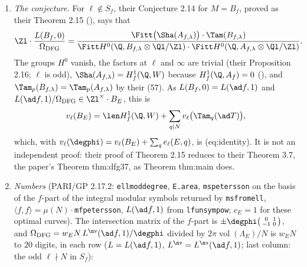 \begin{remark}
\begin{enumerate}[label=(\alph*)]
Deligne's period relative to their integral structure, $\Omega_{\mathrm{DFG}}=c^+(B_f)/e$, satisfies
\[
\Omega_{\mathrm{DFG}}\in\Zl^\times\cdot\frac{w_EN\,L^{\nv}(\ad f,1)}{\degphi}=\Zl^\times\cdot w_E\,\frac{2\pi\operatorname{vol}(\Lambda_E)}{c_E^2}=\Zl^\times\cdot w_EN\cdot\frac{2\pi\operatorname{vol}(\Lambda_E)}{c_E^2N}.
\]
If $e$ is normalised by the $\Z$-lattice $\varphi_E^*H^1(E,\Z)$ with the pairing $\frac12\langle x,w_N^*y\rangle$, the unit is $\pm1$: the $\frac12$ of (d) cancels the $\frac12$ of the pairing, and
$\degphi$ cancels between the Petersson norm and $\eta^\emptyset$. The only discrepancy with the book's normalisation $2\pi\operatorname{vol}(\Lambda_E)/(c_E^2N)$ is therefore the factor $w_EN$,
a unit at every $\ell\nmid N$; no power of $2$ or $\pi$ is left over.
\item \emph{The conjecture.} For $\ell\notin S_f$, their Conjecture 2.14 for $M=B_f$, proved as their Theorem 2.15 (), says that
\[
\Zl\cdot\frac{L(B_f,0)}{\Omega_{\mathrm{DFG}}}=\frac{\Fitt\bigl(\Sha(A_{f,\lambda})\bigr)\cdot\Tam(B_{f,\lambda})}{\Fitt H^0(\Q,B_{f,\lambda}\otimes\Ql/\Zl)\cdot\Fitt H^0(\Q,A_{f,\lambda}\otimes\Ql/\Zl)}.
\]
The groups $H^0$ vanish, the factors at $\ell$ and $\infty$ are trivial
(their Proposition 2.16; $\ell$ is odd), $\Sha(A_{f,\lambda})=H^1_f(\Q,W)$ because $H^1_f(\Q,A_f)=0$ (), and $\Tam_p(B_{f,\lambda})=\Tam_p(A_{f,\lambda})$ by their
(57). As $L(B_f,0)=L(\ad f,1)$ and $L(\ad f,1)/\Omega_{\mathrm{DFG}}\in\Zl^\times\cdot B_E$, this is
\[
v_\ell(B_E)=\len H^1_f(\Q,W)+\sum_{q\mid N}v_\ell\bigl(\Tam_q(\ad T)\bigr),
\]
which, with $v_\ell(\degphi)=v_\ell(B_E)+\sum_qe_\ell(E,q)$, is (eq:identity). It is not an independent proof: their proof of Theorem 2.15 reduces to their Theorem 3.7, the paper's
Theorem thm:dfg37, as Theorem thm:main does.
\item \emph{Numbers} (PARI/GP 2.17.2: \texttt{ellmoddegree}, \texttt{E.area}, \texttt{mspetersson} on the basis of the $f$-part of the integral modular symbols returned by
\texttt{msfromell}, $\langle f,f\rangle=\mu(N)\cdot$\texttt{mfpetersson}, $L(\ad f,1)$ from \texttt{lfunsympow}; $c_E=1$ for these optimal curves). The intersection matrix of the $f$-part is
$\pm\degphi\bigl(\begin{smallmatrix}0&1\\-1&0\end{smallmatrix}\bigr)$, and $\Omega_{\mathrm{DFG}}=w_EN\,L^{\nv}(\ad f,1)/\degphi$ divided by $2\pi\operatorname{vol}(\Lambda_E)/N$ is $w_EN$ to $20$
digits, in each row ($L=L(\ad f,1)$, $L^{\nv}=L^{\nv}(\ad f,1)$; last column: the odd $\ell\nmid N$ in $S_f$):

\end{enumerate}
\end{remark}
